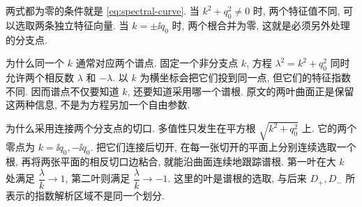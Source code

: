 两式都为零的条件就是 \eqref{eq:spectral-curve}. 当 $k^2+q_0^2\ne0$ 时, 两个特征值不同, 可以选取两条独立特征向量. 当 $k=\pm\ii q_0$ 时, 两个根合并为零, 这就是必须另外处理的分支点.
\par\smallskip\noindent 为什么同一个 $k$ 通常对应两个谱点.\quad
固定一个非分支点 $k$, 方程 $\lambda^2=k^2+q_0^2$ 同时允许两个相反数 $\lambda$ 和 $-\lambda$. 以 $k$ 为横坐标会把它们投到同一点, 但它们的特征指数不同. 因而谱点不仅要知道 $k$, 还要知道采用哪一个谱根. 原文的两叶曲面正是保留这两种信息, 不是为方程另加一个自由参数.
\par\smallskip\noindent 为什么采用连接两个分支点的切口.\quad
多值性只发生在平方根 $\sqrt{k^2+q_0^2}$ 上. 它的两个零点为 $k=\ii q_0,-\ii q_0$. 把它们连接后切开, 在每一张切开的平面上分别连续选取一个根, 再将两张平面的相反切口边粘合, 就能沿曲面连续地跟踪谱根. 第一叶在大 $k$ 处满足 $\dfrac{\lambda}{k}\to1$, 第二叶则满足 $\dfrac{\lambda}{k}\to-1$. 这里的叶是谱根的选取, 与后来 $D_+,D_-$ 所表示的指数解析区域不是同一个划分.

